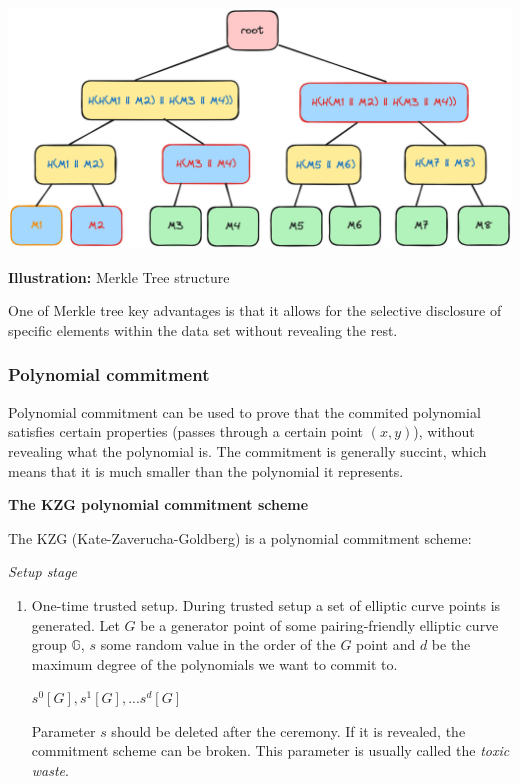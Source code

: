 \documentclass[../lecture-notes.tex]{subfiles}
\begin{document}
\begin{center}
    \centering\includegraphics[width=0.9\linewidth, clip]{images/lecture_5/MerkleTreeProof.png}

    \scriptsize{\textbf{Illustration:} Merkle Tree structure}
\end{center}

One of Merkle tree key advantages is that it allows for the selective disclosure of specific elements within the data set without revealing the rest. 

\subsubsection{Polynomial commitment}

Polynomial commitment can be used to prove that the commited polynomial satisfies certain properties (passes through a certain point $(x,y)$), without revealing what the polynomial is.
The commitment is generally succint, which means that it is much smaller than the polynomial it represents.

\vspace{0.5 cm}

\textbf{The KZG polynomial commitment scheme}

\vspace{0.5 cm}


The KZG (Kate-Zaverucha-Goldberg) is a polynomial commitment scheme:

\textit{Setup stage}

\begin{enumerate}
    \item One-time trusted setup. During trusted setup a set of elliptic curve points is generated. Let $G$ be a generator point of some pairing-friendly
    elliptic curve group $\mathbb{G}$, $s$ some random value in the order of the $G$ point and $d$ be the maximum degree of the polynomials we want to commit to.

    \begin{center}
        $s^0[G], s^1[G], ... s^d[G]$
    \end{center}

    Parameter $s$ should be deleted after the ceremony. If it is revealed, the commitment scheme can be broken. This parameter is usually called the \textit{toxic waste}.

\end{enumerate}
\end{document}
